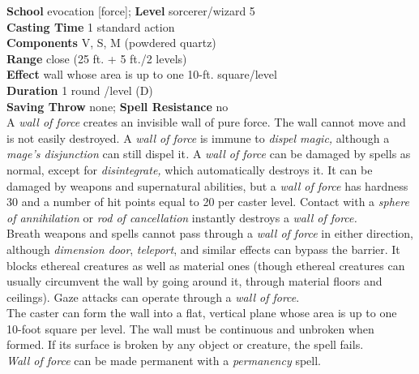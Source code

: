 \textbf{School} evocation [force]; \textbf{Level} sorcerer/wizard 5\\
\textbf{Casting Time} 1 standard action\\
\textbf{Components} V, S, M (powdered quartz)\\
\textbf{Range} close (25 ft. + 5 ft./2 levels)\\
\textbf{Effect }wall whose area is up to one 10-ft. square/level\\
\textbf{Duration} 1 round /level (D)\\
\textbf{Saving Throw} none; \textbf{Spell Resistance} no\\
A \textit{wall of force} creates an invisible wall of pure force. The wall cannot move and is not easily destroyed. A \textit{wall of force} is immune to \textit{dispel magic, }although a \textit{mage's disjunction} can still dispel it\textit{. }A\textit{ wall of force }can be damaged by spells as normal, except for\textit{ disintegrate,} which automatically destroys it. It can be damaged by weapons and supernatural abilities, but a \textit{wall of force} has hardness 30 and a number of hit points equal to 20 per caster level. Contact with a \textit{sphere of annihilation }or \textit{rod of cancellation} instantly destroys a \textit{wall of force.}\\
Breath weapons and spells cannot pass through a \textit{wall of force} in either direction, although \textit{dimension door}, \textit{teleport}, and similar effects can bypass the barrier. It blocks ethereal creatures as well as material ones (though ethereal creatures can usually circumvent the wall by going around it, through material floors and ceilings). Gaze attacks can operate through a \textit{wall of force}.\\
The caster can form the wall into a flat, vertical plane whose area is up to one 10-foot square per level. The wall must be continuous and unbroken when formed. If its surface is broken by any object or creature, the spell fails.\\
\textit{Wall of force }can be made permanent with a \textit{permanency }spell.\\
